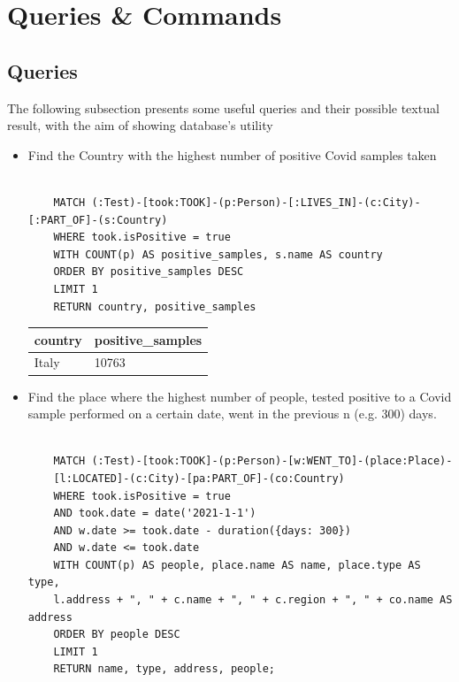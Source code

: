 \documentclass{article}[IEEEtran]
\begin{document}
\newpage

\section{Queries \& Commands}\label{cmd-que}

\subsection{Queries}

The following subsection presents some useful queries and their possible textual result, with the aim of showing database's utility

\begin{itemize}

    \item Find the Country with the highest number of positive Covid samples taken
    
    \begin{lstlisting}
    
    MATCH (:Test)-[took:TOOK]-(p:Person)-[:LIVES_IN]-(c:City)-[:PART_OF]-(s:Country)
    WHERE took.isPositive = true
    WITH COUNT(p) AS positive_samples, s.name AS country
    ORDER BY positive_samples DESC
    LIMIT 1
    RETURN country, positive_samples
    \end{lstlisting}
    
    \vspace{-0.5cm}
    
    \begin{table}[H]
    \hspace{1.55cm}
    \begin{tabular}{|l|l|}
    \hline
    \textbf{country} & \textbf{positive\_samples} \\ \hline
    Italy            & 10763                    \\ \hline
    \end{tabular}
    \end{table}
    
    \item Find the place where the highest number of people, tested positive to a Covid sample performed on a certain date, went in the previous n (e.g. 300) days.
    
    \begin{lstlisting}
    
    MATCH (:Test)-[took:TOOK]-(p:Person)-[w:WENT_TO]-(place:Place)-
    [l:LOCATED]-(c:City)-[pa:PART_OF]-(co:Country)
    WHERE took.isPositive = true
    AND took.date = date('2021-1-1')
    AND w.date >= took.date - duration({days: 300})
    AND w.date <= took.date
    WITH COUNT(p) AS people, place.name AS name, place.type AS type,
    l.address + ", " + c.name + ", " + c.region + ", " + co.name AS address
    ORDER BY people DESC
    LIMIT 1
    RETURN name, type, address, people;


\end{lstlisting}
\end{itemize}
\end{document}

